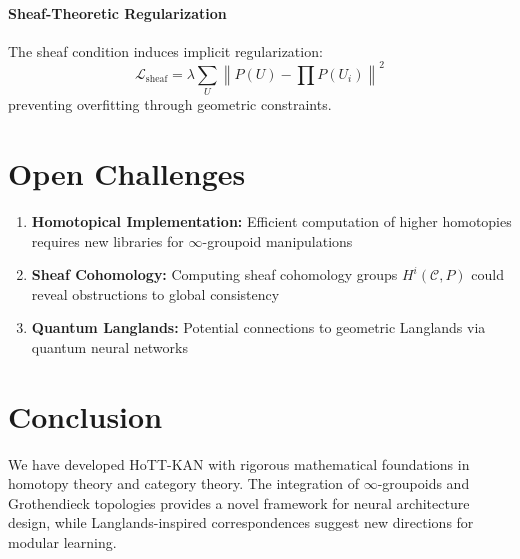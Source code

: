 \documentclass{article}
\begin{document}
\paragraph{Sheaf-Theoretic Regularization} The sheaf condition induces implicit regularization:
\begin{equation}
    \mathcal{L}_{\text{sheaf}} = \lambda \sum_U \left\| P(U) - \prod P(U_i) \right\|^2
\end{equation}
preventing overfitting through geometric constraints.

\section{Open Challenges}
\label{sec:open_challenges}

\begin{enumerate}
    \item \textbf{Homotopical Implementation:} Efficient computation of higher homotopies requires new libraries for $\infty$-groupoid manipulations
    \item \textbf{Sheaf Cohomology:} Computing sheaf cohomology groups $H^i(\mathcal{C}, P)$ could reveal obstructions to global consistency
    \item \textbf{Quantum Langlands:} Potential connections to geometric Langlands via quantum neural networks
\end{enumerate}

\section{Conclusion}
\label{sec:conclusion}

We have developed HoTT-KAN with rigorous mathematical foundations in homotopy theory and category theory. The integration of $\infty$-groupoids and Grothendieck topologies provides a novel framework for neural architecture design, while Langlands-inspired correspondences suggest new directions for modular learning.
\end{document}
